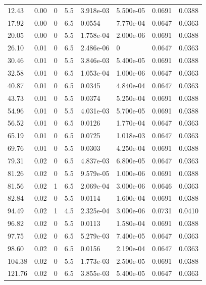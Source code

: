 \documentclass[preview]{standalone}
\begin{document}
{{\begin{tabular}{L{1.2cm}C{1.2cm} C{0.3cm}C{0.5cm} C{1.4cm}C{1.4cm} C{1.4cm}C{1.4cm}}
  12.43  &  0.00  & 0     & 5.5 &  3.918e-03  & 5.500e-05  & 0.0691 &  0.0388   \\ 
  17.92  &  0.00  & 0     & 6.5 &  0.0554  & 7.770e-04  & 0.0647 &  0.0363   \\ 
  20.05  &  0.00  & 0     & 5.5 &  1.758e-04  & 2.000e-06  & 0.0691 &  0.0388   \\ 
  26.10  &  0.01  & 0     & 6.5 &  2.486e-06  & 0  & 0.0647 &  0.0363   \\ 
  30.46  &  0.01  & 0     & 5.5 &  3.846e-03  & 5.400e-05  & 0.0691 &  0.0388   \\ 
  32.58  &  0.01  & 0     & 6.5 &  1.053e-04  & 1.000e-06  & 0.0647 &  0.0363   \\ 
  40.87  &  0.01  & 0     & 6.5 &  0.0345  & 4.840e-04  & 0.0647 &  0.0363   \\ 
  43.73  &  0.01  & 0     & 5.5 &  0.0374  & 5.250e-04  & 0.0691 &  0.0388   \\ 
  54.96  &  0.01  & 0     & 5.5 &  4.031e-03  & 5.700e-05  & 0.0691 &  0.0388   \\ 
  56.52  &  0.01  & 0     & 6.5 &  0.0126  & 1.770e-04  & 0.0647 &  0.0363   \\ 
  65.19  &  0.01  & 0     & 6.5 &  0.0725  & 1.018e-03  & 0.0647 &  0.0363   \\ 
  69.76  &  0.01  & 0     & 5.5 &  0.0303  & 4.250e-04  & 0.0691 &  0.0388   \\ 
  79.31  &  0.02  & 0     & 6.5 &  4.837e-03  & 6.800e-05  & 0.0647 &  0.0363   \\ 
  81.26  &  0.02  & 0     & 5.5 &  9.579e-05  & 1.000e-06  & 0.0691 &  0.0388   \\ 
  81.56  &  0.02  & 1     & 6.5 &  2.069e-04  & 3.000e-06  & 0.0646 &  0.0363   \\ 
  82.84  &  0.02  & 0     & 5.5 &  0.0114  & 1.600e-04  & 0.0691 &  0.0388   \\ 
  94.49  &  0.02  & 1     & 4.5 &  2.325e-04  & 3.000e-06  & 0.0731 &  0.0410   \\ 
  96.82  &  0.02  & 0     & 5.5 &  0.0113  & 1.580e-04  & 0.0691 &  0.0388   \\ 
  97.75  &  0.02  & 0     & 6.5 &  5.279e-03  & 7.400e-05  & 0.0647 &  0.0363   \\ 
  98.60  &  0.02  & 0     & 6.5 &  0.0156  & 2.190e-04  & 0.0647 &  0.0363   \\ 
  104.38  &  0.02  & 0     & 5.5 &  1.773e-03  & 2.500e-05  & 0.0691 &  0.0388   \\ 
  121.76  &  0.02  & 0     & 6.5 &  3.855e-03  & 5.400e-05  & 0.0647 &  0.0363   \\ 

\end{tabular}}}
\end{document}

